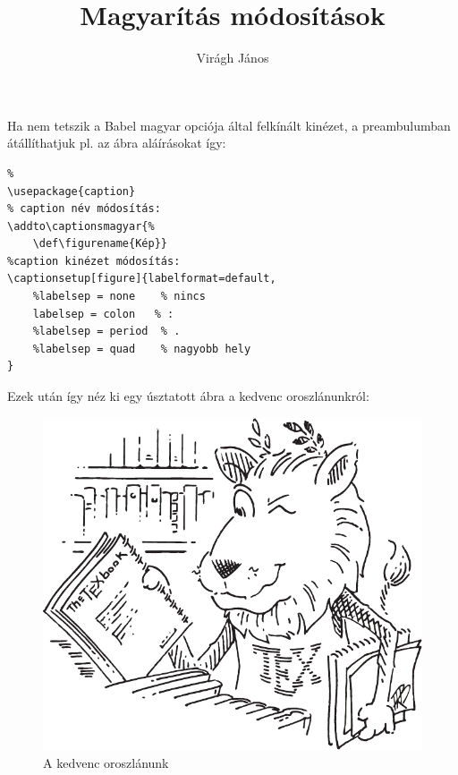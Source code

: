 \documentclass{article}
\title{Magyarítás módosítások}
\author{Virágh János}
\def\figurename{Kép}}
\begin{document}
\maketitle

Ha nem tetszik a Babel magyar opciója által felkínált kinézet, a preambulumban átállíthatjuk pl. az ábra aláírásokat így: 
\begin{verbatim}
%
\usepackage{caption}
% caption név módosítás:
\addto\captionsmagyar{%
	\def\figurename{Kép}}
%caption kinézet módosítás:
\captionsetup[figure]{labelformat=default,
	%labelsep = none    % nincs
	labelsep = colon   % : 
	%labelsep = period  % .
	%labelsep = quad    % nagyobb hely
}
\end{verbatim}
Ezek után így néz ki egy úsztatott ábra a kedvenc oroszlánunkról:
\begin{figure}
\centering	
\includegraphics[scale=0.5]{Lion.pdf}
\caption{A kedvenc oroszlánunk}
\end{figure}
\end{document}
